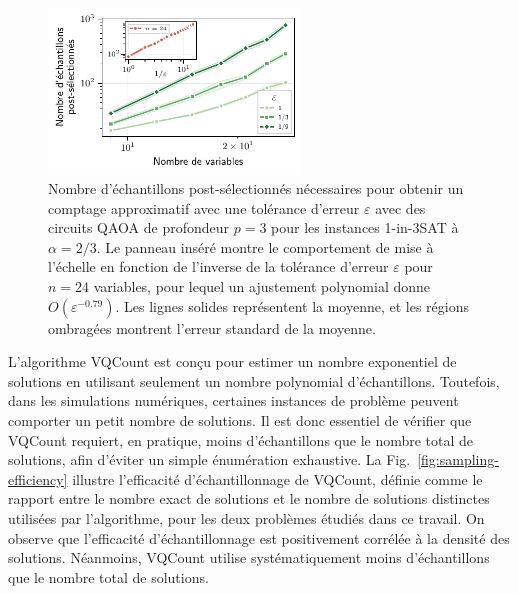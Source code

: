 \begin{figure}[H]
    \centering
    \includegraphics[width=0.6\textwidth]{figures/1in3sat-scaling.pdf}
    \caption[Comportement d'échelle du nombre d'échantillons post-sélectés pour \#1-in-3SAT]{Nombre d'échantillons post-sélectionnés nécessaires pour obtenir un comptage approximatif avec une tolérance d'erreur $\varepsilon$ avec des circuits QAOA de profondeur $p=3$ pour les instances 1-in-3SAT à $\alpha=2/3$. Le panneau inséré montre le comportement de mise à l'échelle en fonction de l'inverse de la tolérance d'erreur $\varepsilon$ pour $n=24$ variables, pour lequel un ajustement polynomial donne $O(\varepsilon^{-0.79})$. Les lignes solides représentent la moyenne, et les régions ombragées montrent l'erreur standard de la moyenne.}
    \label{fig:1in3sat-scaling}
\end{figure}

L'algorithme VQCount est conçu pour estimer un nombre exponentiel de solutions en utilisant seulement un nombre polynomial d'échantillons. Toutefois, dans les simulations numériques, certaines instances de problème peuvent comporter un petit nombre de solutions. Il est donc essentiel de vérifier que VQCount requiert, en pratique, moins d'échantillons que le nombre total de solutions, afin d'éviter un simple énumération exhaustive. La Fig.~\ref{fig:sampling-efficiency} illustre l'efficacité d'échantillonnage de VQCount, définie comme le rapport entre le nombre exact de solutions et le nombre de solutions distinctes utilisées par l'algorithme, pour les deux problèmes étudiés dans ce travail. On observe que l'efficacité d'échantillonnage est positivement corrélée à la densité des solutions. Néanmoins, VQCount utilise systématiquement moins d'échantillons que le nombre total de solutions.


